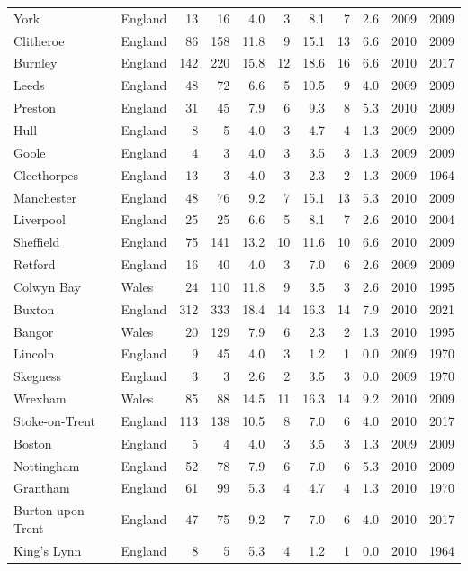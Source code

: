 \documentclass[11pt,a4paper]{article}
\begin{document}
{\begin{longtable}{llrrrrrrrrr}
York & England & 13 & 16 & 4.0 & 3 & 8.1 & 7 & 2.6 & 2009 & 2009\\
Clitheroe & England & 86 & 158 & 11.8 & 9 & 15.1 & 13 & 6.6 & 2010 & 2009\\
Burnley & England & 142 & 220 & 15.8 & 12 & 18.6 & 16 & 6.6 & 2010 & 2017\\
Leeds & England & 48 & 72 & 6.6 & 5 & 10.5 & 9 & 4.0 & 2009 & 2009\\
Preston & England & 31 & 45 & 7.9 & 6 & 9.3 & 8 & 5.3 & 2010 & 2009\\
Hull & England & 8 & 5 & 4.0 & 3 & 4.7 & 4 & 1.3 & 2009 & 2009\\
Goole & England & 4 & 3 & 4.0 & 3 & 3.5 & 3 & 1.3 & 2009 & 2009\\
Cleethorpes & England & 13 & 3 & 4.0 & 3 & 2.3 & 2 & 1.3 & 2009 & 1964\\
Manchester & England & 48 & 76 & 9.2 & 7 & 15.1 & 13 & 5.3 & 2010 & 2009\\
Liverpool & England & 25 & 25 & 6.6 & 5 & 8.1 & 7 & 2.6 & 2010 & 2004\\
Sheffield & England & 75 & 141 & 13.2 & 10 & 11.6 & 10 & 6.6 & 2010 & 2009\\
Retford & England & 16 & 40 & 4.0 & 3 & 7.0 & 6 & 2.6 & 2009 & 2009\\
Colwyn Bay & Wales & 24 & 110 & 11.8 & 9 & 3.5 & 3 & 2.6 & 2010 & 1995\\
Buxton & England & 312 & 333 & 18.4 & 14 & 16.3 & 14 & 7.9 & 2010 & 2021\\
Bangor & Wales & 20 & 129 & 7.9 & 6 & 2.3 & 2 & 1.3 & 2010 & 1995\\
Lincoln & England & 9 & 45 & 4.0 & 3 & 1.2 & 1 & 0.0 & 2009 & 1970\\
Skegness & England & 3 & 3 & 2.6 & 2 & 3.5 & 3 & 0.0 & 2009 & 1970\\
Wrexham & Wales & 85 & 88 & 14.5 & 11 & 16.3 & 14 & 9.2 & 2010 & 2009\\
Stoke-on-Trent & England & 113 & 138 & 10.5 & 8 & 7.0 & 6 & 4.0 & 2010 & 2017\\
Boston & England & 5 & 4 & 4.0 & 3 & 3.5 & 3 & 1.3 & 2009 & 2009\\
Nottingham & England & 52 & 78 & 7.9 & 6 & 7.0 & 6 & 5.3 & 2010 & 2009\\
Grantham & England & 61 & 99 & 5.3 & 4 & 4.7 & 4 & 1.3 & 2010 & 1970\\
Burton upon Trent & England & 47 & 75 & 9.2 & 7 & 7.0 & 6 & 4.0 & 2010 & 2017\\
King's Lynn & England & 8 & 5 & 5.3 & 4 & 1.2 & 1 & 0.0 & 2010 & 1964\\

\end{longtable}}
\end{document}
